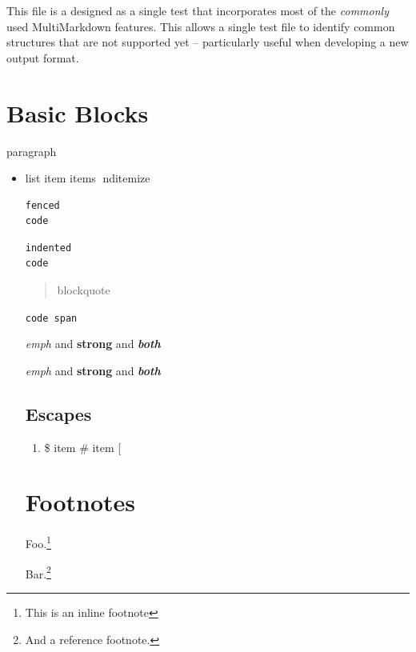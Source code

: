 
\def\mytitle{Integrated}



This file is a designed as a single test that incorporates most of the
\emph{commonly} used MultiMarkdown features. This allows a single test file to
identify common structures that are not supported yet -- particularly useful
when developing a new output format.

\part{Basic Blocks }
\label{basicblocks}

paragraph

\begin{itemize}
\item{} list
item{} items
nd{itemize}

\begin{verbatim}
fenced
code
\end{verbatim}

\begin{verbatim}
indented
code
\end{verbatim}

\begin{quote}
blockquote
\end{quote}

\texttt{code span}

\emph{emph} and \textbf{strong} and \textbf{\emph{both}}

\emph{emph} and \textbf{strong} and \textbf{\emph{both}}

\chapter{Escapes }
\label{escaped}

\begin{enumerate}
\item{} \$
item{} \#
item{} [
\end{enumerate}

\part{Footnotes }
\label{footnotes}

Foo.\footnote{This is an inline footnote}

Bar.\footnote{And a reference footnote.}


\end{itemize}
